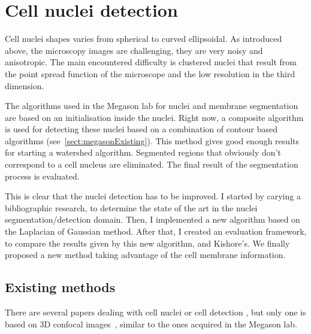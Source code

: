 %
%


\section{Cell nuclei detection}

Cell nuclei shapes varies from spherical to curved ellipsoidal. As introduced above, the microscopy images are challenging, they are very noisy and anisotropic.
The main encountered difficulty is clustered nuclei that result from the point spread function of the microscope and the low resolution in the third dimension.

The algorithms used in the Megason lab for nuclei and membrane segmentation are based on an initialisation inside the nuclei.
Right now, a composite algorithm is used for detecting these nuclei based on a combination of contour based algorithms (see~\ref{sect:megasonExisting}).
This method gives good enough results for starting a watershed algorithm. Segmented regions that obviously don't correspond to a cell nucleus are eliminated. The final result of the segmentation process is evaluated.


This is clear that  the nuclei detection has to be improved.
I started by carying a bibliographic research, to determine the state of the art in the nuclei segmentation/detection domain.
Then, I implemented a new algorithm based on the Laplacian of Gaussian method.
After that, I created an evaluation framework, to compare the results given by this new algorithm, and Kishore's.
We finally proposed a new method taking advantage of the cell membrane information.



\subsection{Existing methods}

There are several papers dealing with cell nuclei or cell detection 
\cite{loukas2003image,umesh2001efficient,al2009improved},
but only one is based on 3D confocal images~\cite{li20073}, similar to the ones acquired in the Megason lab.


